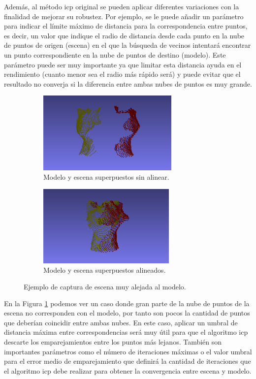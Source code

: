 Además, al método \gls{icp} original se pueden aplicar diferentes variaciones con la finalidad de mejorar su robustez.
Por ejemplo, se le puede añadir un parámetro para indicar el límite máximo de distancia para la correspondencia entre puntos, es decir, un valor que indique el radio de distancia desde cada punto en la nube de puntos de origen (escena) en el que la búsqueda de vecinos intentará encontrar un punto correspondiente en la nube de puntos de destino (modelo).
Este parámetro puede ser muy importante ya que limitar esta distancia ayuda en el rendimiento (cuanto menor sea el radio más rápido será) y puede evitar que el resultado no converja si la diferencia entre ambas nubes de puntos es muy grande.

\begin{figure}[h]
    \centering
    \begin{subfigure}[t]{0.33\textheight}
    	\centering
        \includegraphics[height=4cm]{archivos/metodo-registro-explicacion-superpuesto-2-puntos.png}
        \caption{Modelo y escena superpuestos sin alinear.}
    \end{subfigure}
    \begin{subfigure}[t]{0.33\textheight}
    	\centering
        \includegraphics[height=4cm]{archivos/metodo-registro-explicacion-alineacion-puntos.png}
        \caption{Modelo y escena superpuestos alineados.}
    \end{subfigure}
    \caption{Ejemplo de captura de escena muy alejada al modelo.}
    \label{fig:modelo-escena-alejados-ejemplo}
\end{figure}

En la Figura \ref{fig:modelo-escena-alejados-ejemplo} podemos ver un caso donde gran parte de la nube de puntos de la escena no corresponden con el modelo, por tanto son pocos la cantidad de puntos que deberían coincidir entre ambas nubes.
En este caso, aplicar un umbral de distancia máxima entre correspondencias será muy útil para que el algoritmo \gls{icp} descarte los emparejamientos entre los puntos más lejanos.
También son importantes parámetros como el número de iteraciones máximas o el valor umbral para el error medio de emparejamiento que definirá la cantidad de iteraciones que el algoritmo \gls{icp} debe realizar para obtener la convergencia entre escena y modelo.


